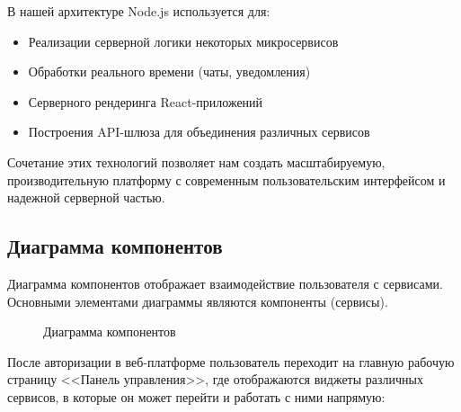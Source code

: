 В нашей архитектуре Node.js используется для:
\begin{itemize}
\item Реализации серверной логики некоторых микросервисов
\item Обработки реального времени (чаты, уведомления)
\item Серверного рендеринга React-приложений
\item Построения API-шлюза для объединения различных сервисов
\end{itemize}

Сочетание этих технологий позволяет нам создать масштабируемую, производительную платформу с современным пользовательским интерфейсом и надежной серверной частью.

\subsection{Диаграмма компонентов}

Диаграмма компонентов отображает взаимодействие пользователя с сервисами. Основными элементами диаграммы являются компоненты (сервисы).

\begin{figure}[H]
\caption{Диаграмма компонентов}
\label{comp:image}
\end{figure}

После авторизации в веб-платформе пользователь переходит на главную рабочую страницу <<Панель управления>>, где отображаются виджеты различных сервисов, в которые он может перейти и работать с ними напрямую:

